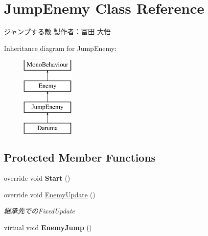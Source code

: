 \hypertarget{class_jump_enemy}{}\section{Jump\+Enemy Class Reference}
\label{class_jump_enemy}


ジャンプする敵 製作者：冨田 大悟  


Inheritance diagram for Jump\+Enemy\+:\begin{figure}[H]
\begin{center}
\leavevmode
\includegraphics[height=4.000000cm]{class_jump_enemy}
\end{center}
\end{figure}
\subsection*{Protected Member Functions}
\begin{DoxyCompactItemize}
\item 
\mbox{\label{class_jump_enemy_a3a5a53fb7a0b8bbbd1719aec166b710f}} 
override void {\bfseries Start} ()
\item 
override void \hyperlink{class_jump_enemy_ab5eb8680db77e9ed5ab5696b41aa7b29}{Enemy\+Update} ()
\begin{DoxyCompactList}\small\item\em 継承先での\+Fixed\+Update \end{DoxyCompactList}\item 
\mbox{\label{class_jump_enemy_ae07ef89ed8a5740e98831a78ac6a5057}} 
virtual void {\bfseries Enemy\+Jump} ()
\end{DoxyCompactItemize}
